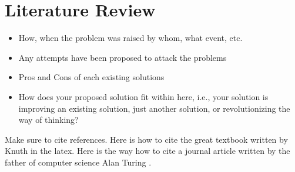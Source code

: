 \section{Literature Review}
\begin{itemize}

\item How, when the problem was raised by whom, what event, etc. 
\item Any attempts have been proposed to attack the problems
\item Pros and Cons of each existing solutions
\item How does your proposed solution fit within here, i.e., your solution is improving an existing solution, just another solution, or revolutionizing the way of thinking?
\end{itemize}

Make sure to cite references. Here is how to cite the great textbook written by Knuth \cite{knuth2006art}in the latex. Here is the way how to cite a journal article written by the father of computer science Alan Turing \cite{turing1950computing}. 